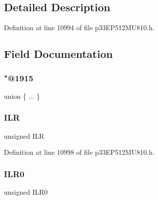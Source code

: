 \begin{DoxyCompactItemize}
\begin{tabbing}
\end{tabbing}\end{DoxyCompactItemize}


\subsection{Detailed Description}


Definition at line 10994 of file p33\+E\+P512\+M\+U810.\+h.



\subsection{Field Documentation}
\mbox{\label{structtag_i_n_t_t_r_e_g_b_i_t_s_af434f1e6205bb0ea48b972940c5cfa86}} 
\subsubsection{\texorpdfstring{"@1915}{@1915}}
{\footnotesize\ttfamily union \{ ... \} }

\mbox{\label{structtag_i_n_t_t_r_e_g_b_i_t_s_acedce2a2404b45b026dc721fd0bd4f18}} 
\subsubsection{\texorpdfstring{I\+LR}{ILR}}
{\footnotesize\ttfamily unsigned I\+LR}



Definition at line 10998 of file p33\+E\+P512\+M\+U810.\+h.

\mbox{\label{structtag_i_n_t_t_r_e_g_b_i_t_s_a5f16ea78b2bfb38b0d403a62d9aefa17}} 
\subsubsection{\texorpdfstring{I\+L\+R0}{ILR0}}
{\footnotesize\ttfamily unsigned I\+L\+R0}



